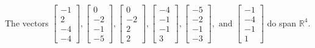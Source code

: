\begin{exercise}
\begin{exerciseStatement}
  \end{exerciseStatement}
  \begin{exerciseAnswer}
   The vectors \(\left[\begin{array}{r}
-1 \\
2 \\
-4 \\
-4
\end{array}\right] , \left[\begin{array}{r}
0 \\
-2 \\
-1 \\
-5
\end{array}\right] , \left[\begin{array}{r}
0 \\
-2 \\
2 \\
2
\end{array}\right] , \left[\begin{array}{r}
-4 \\
-1 \\
-1 \\
3
\end{array}\right] , \left[\begin{array}{r}
-5 \\
-2 \\
-1 \\
-3
\end{array}\right] , \text{ and } \left[\begin{array}{r}
-1 \\
-4 \\
-1 \\
1
\end{array}\right]\) 
  	 do  
	span \(\mathbb{R}^4\).
  


  \end{exerciseAnswer}
\end{exercise}